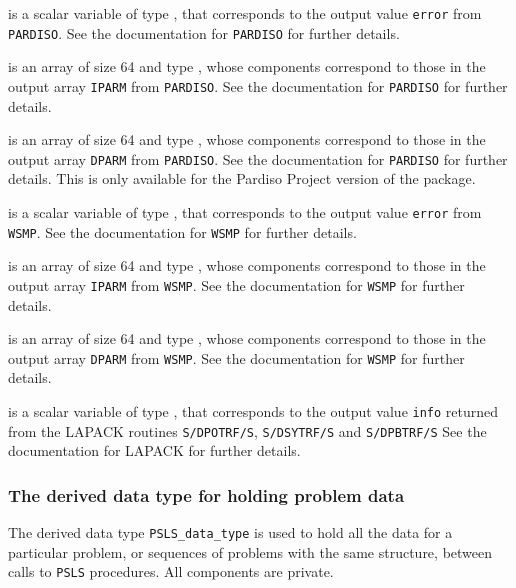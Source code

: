 \documentclass{galahad}
\newcommand{\packagename}{PSLS}
\begin{document}
\begin{description}
 is a scalar variable of type \integer,
that corresponds to the output value {\tt error}
from {\tt PARDISO}. See the documentation for {\tt PARDISO} for further
details.

 is an array of size 64 and type \integer,
whose components correspond to those in the output array {\tt IPARM}
from {\tt PARDISO}. See the documentation for {\tt PARDISO} for further
details.

 is an array of size 64 and type \realdp,
whose components correspond to those in the output array {\tt DPARM}
from {\tt PARDISO}. See the documentation for {\tt PARDISO} for further
details. This is only available for the Pardiso Project version of the package.

 is a scalar variable of type \integer,
that corresponds to the output value {\tt error}
from {\tt WSMP}. See the documentation for {\tt WSMP} for further
details.

 is an array of size 64 and type \integer,
whose components correspond to those in the output array {\tt IPARM}
from {\tt WSMP}. See the documentation for {\tt WSMP} for further
details.

 is an array of size 64 and type \realdp,
whose components correspond to those in the output array {\tt DPARM}
from {\tt WSMP}. See the documentation for {\tt WSMP} for further
details.

 is a scalar variable of type \integer,
that corresponds to the output value {\tt info} returned from
the LAPACK routines {\tt S/DPOTRF/S},
{\tt S/DSYTRF/S} and {\tt S/DPBTRF/S}
See the documentation for LAPACK for further
details.

\end{description}



\subsubsection{The derived data type for holding problem data}\label{typedata}
The derived data type
{\tt \packagename\_data\_type}
is used to hold all the data for a particular problem,
or sequences of problems with the same structure, between calls to
{\tt \packagename} procedures.
All components are private.
\end{document}
